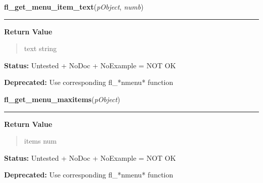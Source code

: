     \label{xformslib:library:fl_get_menu_item_text}

    \vspace{0.5ex}

\hspace{.8\funcindent}\begin{boxedminipage}{\funcwidth}

    \raggedright \textbf{fl\_get\_menu\_item\_text}(\textit{pObject}, \textit{numb})

    \vspace{-1.5ex}

    \rule{\textwidth}{0.5\fboxrule}
\setlength{\parskip}{2ex}
\setlength{\parskip}{1ex}
      \textbf{Return Value}
    \vspace{-1ex}

      \begin{quote}
      text string

      \end{quote}

\textbf{Status:} Untested + NoDoc + NoExample = NOT OK



\textbf{Deprecated:} Use corresponding fl\_*nmenu* function



    \end{boxedminipage}

    \label{xformslib:library:fl_get_menu_maxitems}

    \vspace{0.5ex}

\hspace{.8\funcindent}\begin{boxedminipage}{\funcwidth}

    \raggedright \textbf{fl\_get\_menu\_maxitems}(\textit{pObject})

    \vspace{-1.5ex}

    \rule{\textwidth}{0.5\fboxrule}
\setlength{\parskip}{2ex}
\setlength{\parskip}{1ex}
      \textbf{Return Value}
    \vspace{-1ex}

      \begin{quote}
      items num

      \end{quote}

\textbf{Status:} Untested + NoDoc + NoExample = NOT OK



\textbf{Deprecated:} Use corresponding fl\_*nmenu* function



    \end{boxedminipage}

